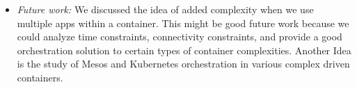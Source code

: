 \documentclass[letterpaper,twocolumn,10pt]{article}
\begin{document}
\begin{itemize}
\item {\it Future work:} 
We discussed the idea of added complexity when we use multiple apps within a container. This might
be good future work because we could analyze time constraints, connectivity constraints, and provide
a good orchestration solution to certain types of container complexities. Another Idea is the study of 
Mesos and Kubernetes orchestration in various complex driven containers. 

\end{itemize}
\end{document}
